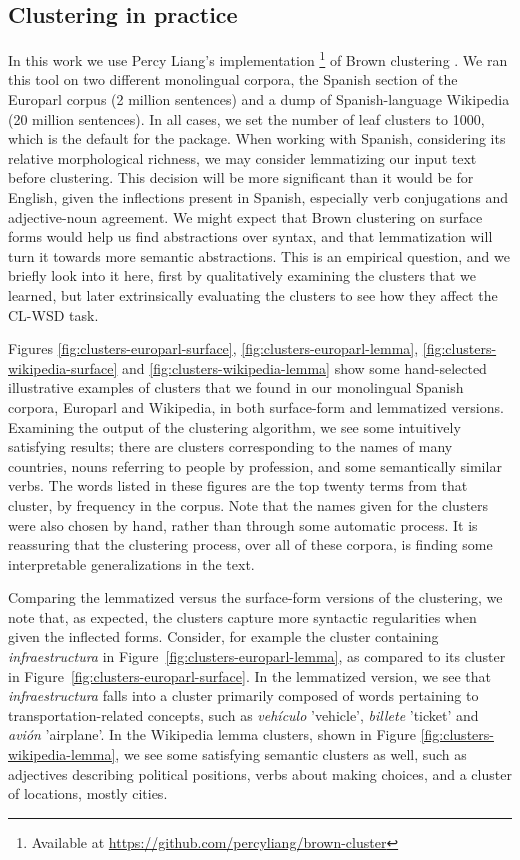 \subsection{Clustering in practice}
In this work we use Percy Liang's implementation \footnote{Available at
\url{https://github.com/percyliang/brown-cluster}} of Brown clustering
\cite{Liang05semi-supervisedlearning}. We ran this tool on two different
monolingual corpora, the Spanish section of the Europarl corpus \cite{europarl}
(2 million sentences) and a dump of Spanish-language Wikipedia (20 million
sentences). In all cases, we set the number of leaf clusters to 1000, which is
the default for the package.
When working with Spanish, considering its relative morphological richness, we
may consider lemmatizing our input text before clustering. This decision will
be more significant than it would be for English, given the inflections present
in Spanish, especially verb conjugations and adjective-noun agreement.
We might expect that Brown clustering on surface forms would help us find
abstractions over syntax, and that lemmatization will turn it towards more
semantic abstractions. This is an empirical question, and we briefly look into
it here, first by qualitatively examining the clusters that we learned, but
later extrinsically evaluating the clusters to see how they affect the CL-WSD
task.



Figures \ref{fig:clusters-europarl-surface}, \ref{fig:clusters-europarl-lemma},
\ref{fig:clusters-wikipedia-surface} and \ref{fig:clusters-wikipedia-lemma}
show some hand-selected illustrative examples of clusters that we found in our
monolingual Spanish corpora, Europarl and Wikipedia, in both surface-form and
lemmatized versions. Examining the output of the clustering algorithm, we see
some intuitively satisfying results; there are clusters corresponding to the
names of many countries, nouns referring to people by profession, and some
semantically similar verbs. The words listed in these figures are the top
twenty terms from that cluster, by frequency in the corpus. Note that the names
given for the clusters were also chosen by hand, rather than through some
automatic process. It is reassuring that the clustering process, over all of
these corpora, is finding some interpretable generalizations in the text.

Comparing the lemmatized versus the surface-form versions of the clustering, we
note that, as expected, the clusters capture more syntactic regularities when
given the inflected forms. Consider, for example the cluster containing
\emph{infraestructura} in Figure~\ref{fig:clusters-europarl-lemma}, as compared
to its cluster in Figure~\ref{fig:clusters-europarl-surface}. In the lemmatized
version, we see that \emph{infraestructura} falls into a cluster primarily
composed of words pertaining to transportation-related concepts, such as
\emph{vehículo} 'vehicle', \emph{billete} 'ticket' and \emph{avión} 'airplane'.
In the Wikipedia lemma clusters, shown in Figure
\ref{fig:clusters-wikipedia-lemma}, we see some satisfying semantic clusters as
well, such as adjectives describing political positions, verbs about making
choices, and a cluster of locations, mostly cities.

